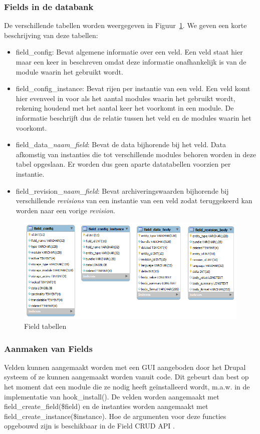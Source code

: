 \subsubsection{Fields in de databank}
De verschillende tabellen worden weergegeven in Figuur~\ref{fig:fieldtabellen}. We geven een korte beschrijving van deze tabellen:
\begin{itemize}
\item field\_config: Bevat algemene informatie over een veld. Een veld staat hier maar een keer in beschreven omdat deze informatie onafhankelijk is van de module waarin het gebruikt wordt.
\item field\_config\_instance: Bevat rijen per instantie van een veld. Een veld komt hier evenveel in voor als het aantal modules waarin het gebruikt wordt, rekening houdend met het aantal keer het voorkomt in een module. De informatie beschrijft dus de relatie tussen het veld en de modules waarin het voorkomt.
\item field\_data\_\textit{naam\_field}: Bevat de data bijhorende bij het veld. Data afkomstig van instanties die tot verschillende modules behoren worden in deze tabel opgeslaan. Er worden dus geen aparte datatabellen voorzien per instantie.
\item field\_revision\_\textit{naam\_field}: Bevat archiveringswaarden bijhorende bij verschillende \textit{revisions} van een instantie van een veld zodat teruggekeerd kan worden naar een vorige \textit{revision}.
\end{itemize}
\begin{figure}[h]
\centering
\includegraphics[width=1\textwidth]{fig/fieldtabellen}
\caption{Field tabellen}
\label{fig:fieldtabellen}
\end{figure}

\subsubsection{Aanmaken van Fields}
Velden kunnen aangemaakt worden met een GUI aangeboden door het Drupal systeem of ze kunnen aangemaakt worden vanuit code. Dit gebeurt dan best op het moment dat een module die ze nodig heeft ge\"{i}nstalleerd wordt, m.a.w. in de implementatie van hook\_install(). De velden worden aangemaakt met field\_create\_field(\$field) en de instanties worden aangemaakt met field\_create\_instance(\$instance). Hoe de argumenten voor deze functies opgebouwd zijn is beschikbaar in de Field CRUD API \cite{fieldCRUD}.

